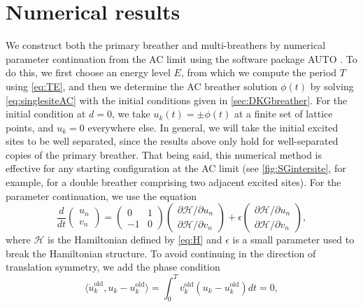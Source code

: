 \documentclass[12pt,reqno]{amsart}
\def\calH{\mathcal{H}}
\theoremstyle{definition}
\begin{document}
\section{Numerical results}\label{sec:numerics}

We construct both the primary breather and multi-breathers by numerical parameter continuation from the AC limit using the software package AUTO \cite{auto07p}. To do this, we first choose an energy level $E$, from which we compute the period $T$ using \cref{eq:TE}, and then we determine the AC breather solution $\phi(t)$ by solving \cref{eq:singlesiteAC} with the initial conditions given in \cref{sec:DKGbreather}. For the initial condition at $d = 0$, we take $u_k(t) = \pm \phi(t)$ at a finite set of lattice points, and $u_k = 0$ everywhere else. In general, we will take the initial excited sites to be well separated, since the results above only hold for well-separated copies of the primary breather. That being said, this numerical method is effective for any starting configuration at the AC limit (see \cref{fig:SGintersite}, for example, for a double breather comprising two adjacent excited sites).
For the parameter continuation, we use the equation
\begin{equation}\label{eq:HformAUTO}
\frac{d}{dt}\begin{pmatrix} u_n \\ v_n \end{pmatrix} = 
\begin{pmatrix} 0 & 1 \\ -1 & 0 \end{pmatrix}\begin{pmatrix} \partial \calH / \partial u_n \\ \partial \calH / \partial v_n \end{pmatrix} + 
\epsilon \begin{pmatrix} \partial \calH / \partial u_n \\ \partial \calH / \partial v_n \end{pmatrix},
\end{equation}
where $\calH$ is the Hamiltonian defined by \cref{eq:H} and $\epsilon$ is a small parameter used to break the Hamiltonian structure. To avoid continuing in the direction of translation symmetry, we add the phase condition
\[
\langle \dot{u}_k^\text{old}, u_k - u_k^\text{old} \rangle =
\int_0^T v_k^\text{old}( u_k - u_k^\text{old}) dt = 0,
\]
\end{document}
